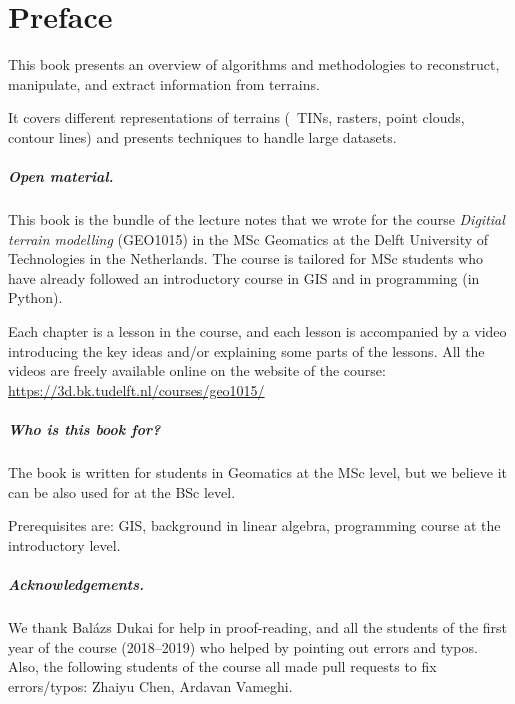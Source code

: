 


\chapter*{Preface}

This book presents an overview of algorithms and methodologies to reconstruct, manipulate, and extract information from terrains.

It covers different representations of terrains (\eg\ TINs, rasters, point clouds, contour lines) and presents techniques to handle large datasets.



\paragraph*{Open material.}
This book is the bundle of the lecture notes that we wrote for the course \emph{Digitial terrain modelling} (GEO1015) in the MSc Geomatics at the Delft University of Technologies in the Netherlands.
The course is tailored for MSc students who have already followed an introductory course in GIS and in programming (in Python).

Each chapter is a lesson in the course, and each lesson is accompanied by a video introducing the key ideas and/or explaining some parts of the lessons.
All the videos are freely available online on the website of the course: \url{https://3d.bk.tudelft.nl/courses/geo1015/}


\paragraph*{Who is this book for?}
The book is written for students in Geomatics at the MSc level, but we believe it can be also used for at the BSc level.

Prerequisites are: GIS, background in linear algebra, programming course at the introductory level.


\paragraph*{Acknowledgements.}
We thank Balázs Dukai for help in proof-reading, and all the students of the first year of the course (2018--2019) who helped by pointing out errors and typos.
Also, the following students of the course all made pull requests to fix errors/typos: Zhaiyu Chen, Ardavan Vameghi.






